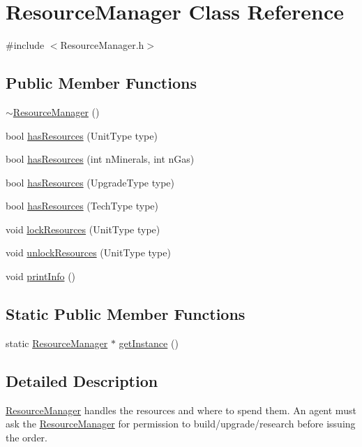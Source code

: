 \hypertarget{class_resource_manager}{\section{Resource\-Manager Class Reference}
\label{class_resource_manager}
}


{\ttfamily \#include $<$Resource\-Manager.\-h$>$}

\subsection*{Public Member Functions}
\begin{DoxyCompactItemize}
\item 
\hyperlink{class_resource_manager_a671c186e4630599e7e36d000c53eaf80}{$\sim$\-Resource\-Manager} ()
\item 
bool \hyperlink{class_resource_manager_acdc7a8b0f41e36993c0aac844bdc35c1}{has\-Resources} (Unit\-Type type)
\item 
bool \hyperlink{class_resource_manager_a3e4a5a940e9b51fc1cf048b7a0b004c2}{has\-Resources} (int n\-Minerals, int n\-Gas)
\item 
bool \hyperlink{class_resource_manager_a627d9091c826edc9db84a9ba7329ae03}{has\-Resources} (Upgrade\-Type type)
\item 
bool \hyperlink{class_resource_manager_a6aa029782dff7c8db546aaca1f955459}{has\-Resources} (Tech\-Type type)
\item 
void \hyperlink{class_resource_manager_aaa722a11f9b7ea4071b998968edc5910}{lock\-Resources} (Unit\-Type type)
\item 
void \hyperlink{class_resource_manager_a3e367f687297cf67e67ee3f2b14f420d}{unlock\-Resources} (Unit\-Type type)
\item 
void \hyperlink{class_resource_manager_afa004d35dbf80b502f172a4c73cf37dc}{print\-Info} ()
\end{DoxyCompactItemize}
\subsection*{Static Public Member Functions}
\begin{DoxyCompactItemize}
\item 
static \hyperlink{class_resource_manager}{Resource\-Manager} $\ast$ \hyperlink{class_resource_manager_a41943f7fb045ad54f1e24da7c6046502}{get\-Instance} ()
\end{DoxyCompactItemize}


\subsection{Detailed Description}
\hyperlink{class_resource_manager}{Resource\-Manager} handles the resources and where to spend them. An agent must ask the \hyperlink{class_resource_manager}{Resource\-Manager} for permission to build/upgrade/research before issuing the order.

